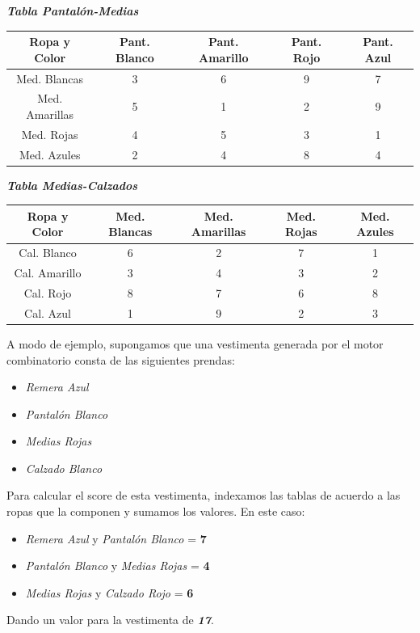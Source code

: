 \vspace*{.9cm}
\textbf{\emph{Tabla Pantal\'on-Medias}}\\

\begin{tabular}{|c|c|c|c|c|}
  \hline Ropa y Color      & Pant. Blanco 	   & Pant. Amarillo	     & Pant. Rojo      & Pant. Azul \\ 
  \hline Med. Blancas      & 3           	   & 6               & 9               &  7          \\
  \hline Med. Amarillas    & 5               & 1               & 2               &  9          \\ 
  \hline Med. Rojas        & 4               & 5               & 3               &  1          \\ 
  \hline Med. Azules       & 2               & 4               & 8               &  4          \\  
  \hline 
\end{tabular}

\vspace*{.9cm}
\textbf{\emph{Tabla Medias-Calzados}}\\

\begin{tabular}{|c|c|c|c|c|}
  \hline Ropa y Color      & Med. Blancas & Med. Amarillas      & Med. Rojas & Med. Azules \\ 
  \hline Cal. Blanco    & 6           & 2                & 7            &  1          \\
  \hline Cal. Amarillo  & 3           & 4                & 3           &  2          \\ 
  \hline Cal. Rojo      & 8           & 7                & 6            &  8          \\ 
  \hline Cal. Azul      & 1           & 9                & 2            &  3          \\  
  \hline 
\end{tabular}

\vspace*{.9cm}
A modo de ejemplo, supongamos que una vestimenta generada por el motor combinatorio consta de las siguientes prendas:
\begin{itemize}
  \item \emph{Remera Azul}
  \item \emph{Pantal\'on Blanco}
  \item \emph{Medias Rojas}
  \item \emph{Calzado Blanco}
\end{itemize}
Para calcular el score de esta vestimenta, indexamos las tablas de acuerdo a las ropas que la componen y sumamos los valores. En este caso:

\begin{itemize}
  \item \emph{Remera Azul} y \emph{Pantal\'on Blanco}  = \textbf{7}
  \item \emph{Pantal\'on Blanco} y \emph{Medias Rojas} = \textbf{4}
  \item \emph{Medias Rojas} y  \emph{Calzado Rojo}    = \textbf{6}
\end{itemize}
Dando un valor para la vestimenta de \emph{ \textbf{17}}.
